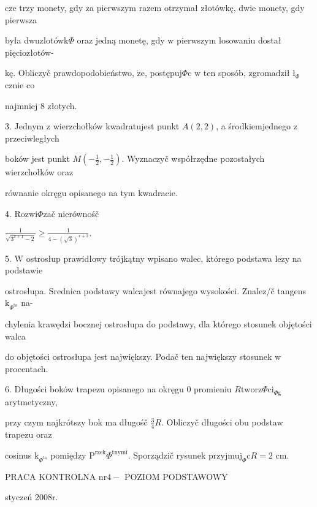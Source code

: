 \documentclass[a4paper,12pt]{article}
\begin{document}
cze trzy monety, gdy za pierwszym razem otrzymał złotówkę, dwie monety, gdy pierwsza

była dwuzlotówk$\Phi$ oraz jedną monetę, gdy $\mathrm{w}$ pierwszym losowaniu dostał pięciozłotów-

kę. Obliczyč prawdopodobieństwo, $\dot{\mathrm{z}}\mathrm{e}$, postępuj$\Phi$c $\mathrm{w}$ ten sposób, zgromadził $\text{ł}_{\Phi}$cznie co

najmniej 8 złotych.

3. Jednym $\mathrm{z}$ wierzchołków kwadratujest punkt $A(2,2)$, a środkiemjednego $\mathrm{z}$ przeciwległych

boków jest punkt $M(-\displaystyle \frac{1}{2},-\frac{1}{2})$. Wyznaczyč współrzędne pozostałych wierzchołków oraz

równanie okręgu opisanego na tym kwadracie.

4. Rozwi$\Phi$zač nierównośč

$\displaystyle \frac{1}{\sqrt{3^{x+1}-2}}\geq\frac{1}{4-(\sqrt{3})^{x+2}}.$

5. $\mathrm{W}$ ostrosłup prawidłowy trójkątny wpisano walec, którego podstawa $\mathrm{l}\mathrm{e}\dot{\mathrm{z}}\mathrm{y}$ na podstawie

ostrosłupa. Srednica podstawy walcajest równajego wysokości. Znalez/č tangens $\mathrm{k}_{\Phi^{\mathrm{t}\mathrm{a}}}$ na-

chylenia krawędzi bocznej ostrosłupa do podstawy, dla którego stosunek objętości walca

do objętości ostrosłupa jest największy. Podač ten największy stosunek $\mathrm{w}$ procentach.

6. Długości boków trapezu opisanego na okręgu $0$ promieniu $R\mathrm{t}\mathrm{w}\mathrm{o}\mathrm{r}\mathrm{z}\Phi \mathrm{c}\mathrm{i}_{\Phi \mathrm{g}}$ arytmetyczny,

przy czym najkrótszy bok ma długośč $\displaystyle \frac{3}{4}R$. Obliczyč długości obu podstaw trapezu oraz

cosinus $\mathrm{k}_{\Phi^{\mathrm{t}\mathrm{a}}}$ pomiędzy $\mathrm{P}^{\mathrm{r}\mathrm{z}\mathrm{e}\mathrm{k}}\Phi^{\mathrm{t}\mathrm{n}\mathrm{y}\mathrm{m}\mathrm{i}}$. Sporządzič rysunek $\mathrm{p}\mathrm{r}\mathrm{z}\mathrm{y}\mathrm{j}\mathrm{m}\mathrm{u}\mathrm{j}_{\Phi}\mathrm{c}R=2$ cm.





PRACA KONTROLNA $\mathrm{n}\mathrm{r}4-$ POZIOM PODSTAWOWY

styczeń 2008r.
\end{document}
